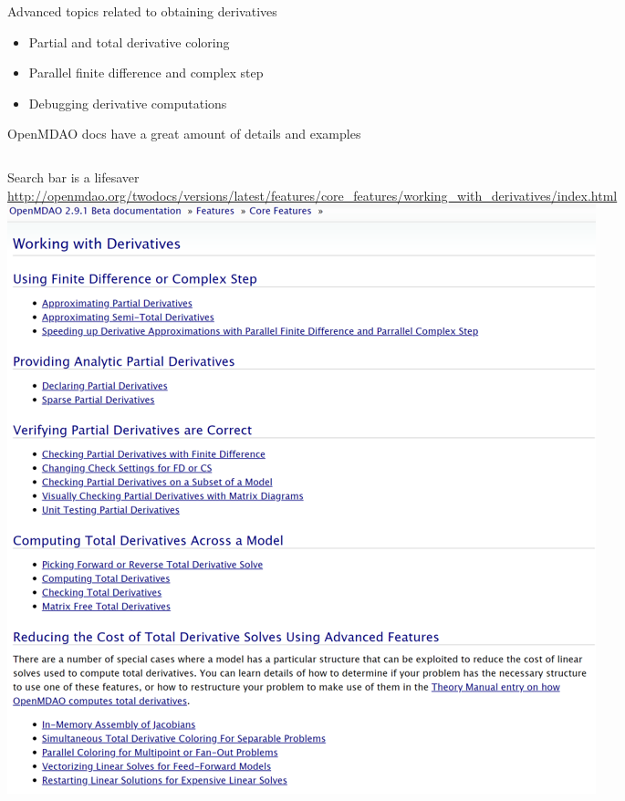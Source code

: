 \documentclass[aspectratio=169, usenames, dvipsnames, 14pt]{beamer}
\begin{document}
\begin{frame}{Advanced topics related to obtaining derivatives}

	\begin{itemize}
		\item Partial and total derivative coloring
		\item Parallel finite difference and complex step
		\item Debugging derivative computations
	\end{itemize}
	
\end{frame}    

\begin{frame}{OpenMDAO docs have a great amount of details and examples}

	\begin{columns}
			Search bar is a lifesaver
			\newline \newline \newline \newline \url{http://openmdao.org/twodocs/versions/latest/features/core_features/working_with_derivatives/index.html}
			\includegraphics[scale=.37]{images/slide_24_derivatives.png}
	\end{columns}

\end{frame} 
\end{document}
